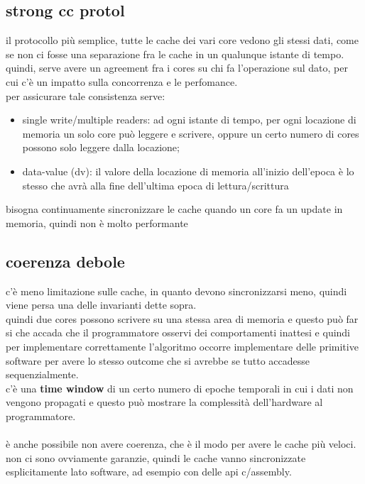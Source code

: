 \documentclass[12pt, oneside]{extbook} %
\begin{document}
\subsection{strong cc protol}
il protocollo più semplice, tutte le cache dei vari core vedono gli stessi dati, come se non ci fosse una separazione fra le cache in un qualunque istante di tempo. quindi, serve avere un agreement fra i cores su chi fa l'operazione sul dato, per cui c'è un impatto sulla concorrenza e le perfomance.\\ per assicurare tale consistenza serve:
\begin{itemize}
\item single write/multiple readers: ad ogni istante di tempo, per ogni locazione di memoria un solo core può leggere e scrivere, oppure un certo numero di cores possono solo leggere dalla locazione;
\item data-value (dv): il valore della locazione di memoria all'inizio dell'epoca è lo stesso che avrà alla fine dell'ultima epoca di lettura/scrittura
\end{itemize}
bisogna continuamente sincronizzare le cache quando un core fa un update in memoria, quindi non è molto performante
\subsection{coerenza debole}
c'è meno limitazione sulle cache, in quanto devono sincronizzarsi meno, quindi viene persa una delle invarianti dette sopra.\\ quindi due cores possono scrivere su una stessa area di memoria e questo può far si che accada che il programmatore osservi dei comportamenti inattesi e quindi per implementare correttamente l'algoritmo occorre implementare delle primitive software per avere lo stesso outcome che si avrebbe se tutto accadesse sequenzialmente.\\ c'è una \textbf{time window} di un certo numero di epoche temporali in cui i dati non vengono propagati e questo può mostrare la complessità dell'hardware al programmatore.\\\\ è anche possibile non avere coerenza, che è il modo per avere le cache più veloci. non ci sono ovviamente garanzie, quindi le cache vanno sincronizzate esplicitamente lato software, ad esempio con delle api c/assembly.
\end{document}
